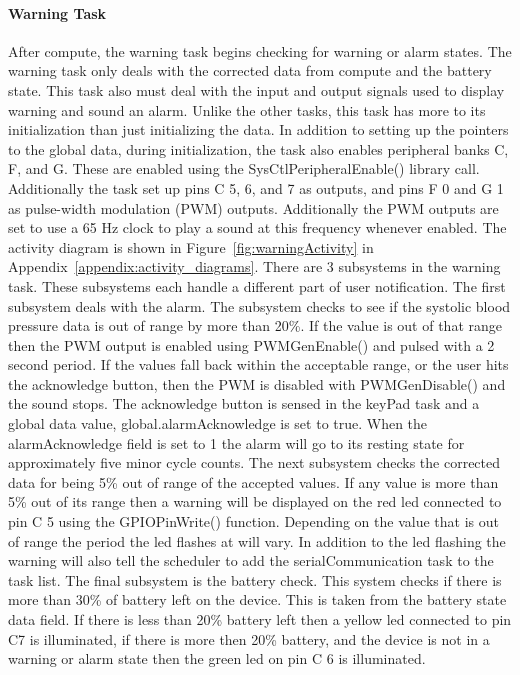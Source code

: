 \documentclass[12pt]{article} %
\begin{document}
    \paragraph{Warning Task} After compute, the warning task begins checking
    for warning or alarm states. The warning task only deals with the corrected
    data from compute and the battery state. This task also must deal with the
    input and output signals used to display warning and sound an alarm. Unlike
    the other tasks, this task has more to its initialization than just
    initializing the data. In addition to setting up the pointers to the global
    data, during initialization, the task also enables peripheral banks C, F,
    and G. These are enabled using the SysCtlPeripheralEnable() library call.
    Additionally the task set up pins C 5, 6, and 7 as outputs, and pins F 0
    and G 1 as pulse-width modulation (PWM) outputs. Additionally the PWM outputs are set to use a 65 Hz
    clock to play a sound at this frequency whenever enabled. The activity
    diagram is shown in Figure~\ref{fig:warningActivity} in Appendix~\ref{appendix:activity_diagrams}. There
    are 3 subsystems in the warning task. These subsystems each handle a
    different part of user notification. The first subsystem deals with the
    alarm. The subsystem checks to see if the systolic blood pressure data is
    out of range by more than 20\%. If the value is out of that range then the
    PWM output is enabled using PWMGenEnable() and pulsed with a 2 second period.
    If the values fall back within the acceptable range, or the user hits the
    acknowledge button, then the PWM is disabled with PWMGenDisable() and the
    sound stops. The acknowledge button is sensed in the keyPad task and a
    global data value, global.alarmAcknowledge is set to true. When the alarmAcknowledge
    field is set to 1 the alarm will go to its resting state for approximately
five minor cycle counts. The next
    subsystem checks the corrected data for being 5\% out of range of the
    accepted values. If any value is more than 5\% out of its range then a
    warning will be displayed on the red led connected to pin C 5 using the
    GPIOPinWrite() function. Depending on the value that is out of range the
    period the led flashes at will vary. In addition to the led flashing the
    warning will also tell the scheduler to add the serialCommunication task to
    the task list. The final subsystem is the battery check. This system checks
    if there is more than 30\% of battery left on the device. This is taken
    from the battery state data field. If there is less than 20\% battery left
    then a yellow led connected to pin C7 is illuminated, if there is more then
    20\% battery, and the device is not in a warning or alarm state then the
    green led on pin C 6 is illuminated. 
    
\end{document}
